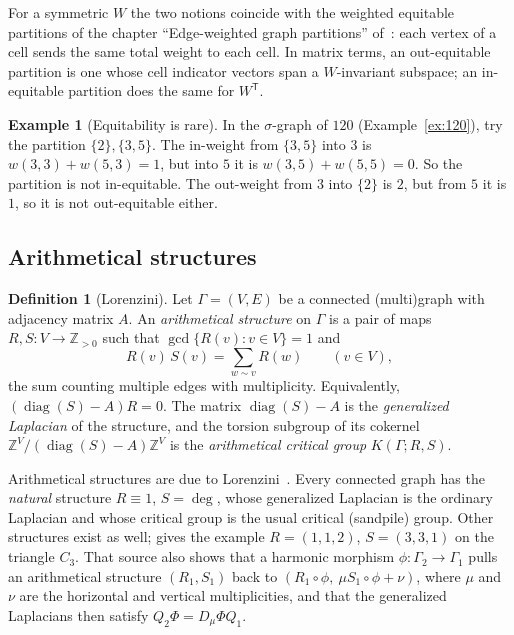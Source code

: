 \documentclass[11pt]{article}
\theoremstyle{definition}
\newtheorem{definition}[theorem]{Definition}
\newtheorem{example}[theorem]{Example}
\theoremstyle{remark}
\begin{document}
For a symmetric $W$ the two notions coincide with the weighted equitable
partitions of the chapter ``Edge-weighted graph partitions''
of~\cite{MJappl}: each vertex of a cell sends the same total weight to each
cell.  In matrix terms, an out-equitable partition is one whose cell
indicator vectors span a $W$-invariant subspace; an in-equitable partition
does the same for $W^{\mathsf T}$.

\begin{example}[Equitability is rare]
In the $\sigma$-graph of $120$ (Example~\ref{ex:120}), try the partition
$\{2\},\{3,5\}$.  The in-weight from $\{3,5\}$ into $3$ is
$w(3,3)+w(5,3)=1$, but into $5$ it is $w(3,5)+w(5,5)=0$.  So the partition is
not in-equitable.  The out-weight from $3$ into $\{2\}$ is $2$, but from $5$
it is $1$, so it is not out-equitable either.
\end{example}

\subsection{Arithmetical structures}\label{sec:arithdefs}

\begin{definition}[Lorenzini]\label{def:arith}
Let $\Gamma=(V,E)$ be a connected (multi)graph with adjacency matrix $A$.  An
\emph{arithmetical structure} on $\Gamma$ is a pair of maps
$R,S\colon V\to\mathbb Z_{>0}$ such that $\gcd\{R(v):v\in V\}=1$ and
\[
R(v)\,S(v)=\sum_{w\sim v}R(w)\qquad(v\in V),
\]
the sum counting multiple edges with multiplicity.  Equivalently,
$(\operatorname{diag}(S)-A)R=0$.  The matrix
$\operatorname{diag}(S)-A$ is the \emph{generalized Laplacian} of the
structure, and the torsion subgroup of its cokernel
$\mathbb Z^V/(\operatorname{diag}(S)-A)\mathbb Z^V$ is the
\emph{arithmetical critical group} $K(\Gamma;R,S)$.
\end{definition}

Arithmetical structures are due to Lorenzini~\cite{Lorenzini}.  Every
connected graph has the \emph{natural} structure $R\equiv1$, $S=\deg$, whose
generalized Laplacian is the ordinary Laplacian and whose critical group is
the usual critical (sandpile) group.  Other structures exist as well;
\cite{MJappl} gives the example $R=(1,1,2)$, $S=(3,3,1)$ on the triangle
$C_3$.  That source also shows that a harmonic morphism
$\phi\colon\Gamma_2\to\Gamma_1$ pulls an arithmetical structure $(R_1,S_1)$
back to $(R_1\circ\phi,\ \mu S_1\circ\phi+\nu)$, where $\mu$ and $\nu$ are
the horizontal and vertical multiplicities, and that the generalized
Laplacians then satisfy $Q_2\Phi=D_\mu\Phi Q_1$.
\end{document}
